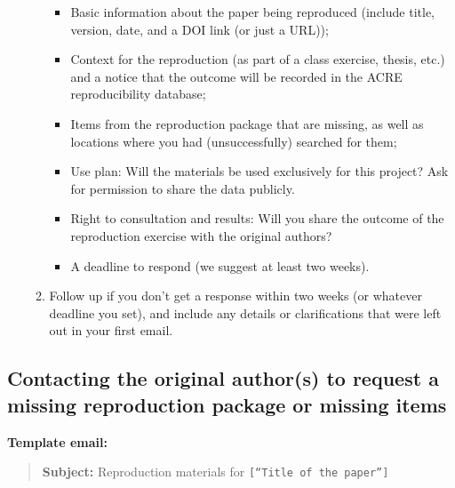 \documentclass[]{book}
\providecommand{\tightlist}{%
  \setlength{\itemsep}{0pt}\setlength{\parskip}{0pt}}
\begin{document}
\begin{enumerate}
\begin{enumerate}
    \begin{itemize}
    \tightlist
    \item
      Basic information about the paper being reproduced (include title, version, date, and a DOI link (or just a URL));\\
    \item
      Context for the reproduction (as part of a class exercise, thesis, etc.) and a notice that the outcome will be recorded in the ACRE reproducibility database;\\
    \item
      Items from the reproduction package that are missing, as well as locations where you had (unsuccessfully) searched for them;\\
    \item
      Use plan: Will the materials be used exclusively for this project? Ask for permission to share the data publicly.\\
    \item
      Right to consultation and results: Will you share the outcome of the reproduction exercise with the original authors?\\
    \item
      A deadline to respond (we suggest at least two weeks).
    \end{itemize}
  \item
    Follow up if you don't get a response within two weeks (or whatever deadline you set), and include any details or clarifications that were left out in your first email.
  \end{enumerate}
\end{enumerate}

\hypertarget{contacting-the-original-authors-to-request-a-missing-reproduction-package-or-missing-items}{%
\subsection{Contacting the original author(s) to request a missing reproduction package or missing items}\label{contacting-the-original-authors-to-request-a-missing-reproduction-package-or-missing-items}}

\textbf{Template email:}

\begin{quote}
\textbf{Subject:} Reproduction materials for \texttt{{[}“Title\ of\ the\ paper”{]}}
\end{quote}
\end{document}
